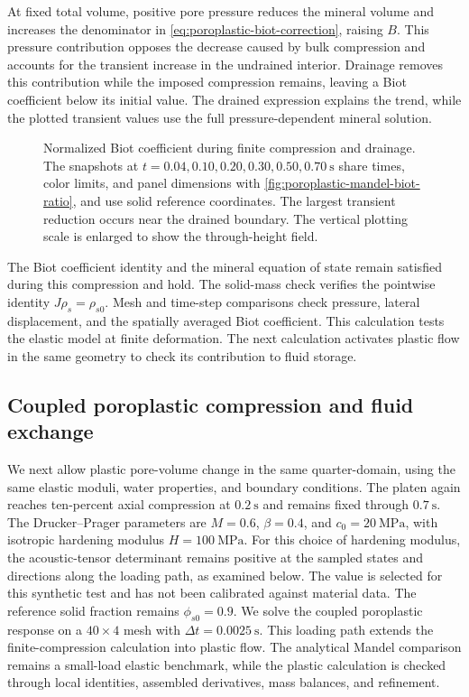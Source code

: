 At fixed total volume, positive pore pressure reduces the mineral volume and
increases the denominator in \eqref{eq:poroplastic-biot-correction}, raising
\(B\). This pressure contribution opposes the decrease caused by bulk
compression and accounts for the transient increase in the undrained interior.
Drainage removes this contribution while the imposed compression remains,
leaving a Biot coefficient below its initial value. The drained expression explains
the trend, while the plotted transient values use the full pressure-dependent
mineral solution.

\begin{figure}[ht]
 \centering
 \caption{Normalized Biot coefficient during finite compression and drainage.
 The snapshots at \(t=0.04,0.10,0.20,0.30,0.50,0.70\ \mathrm{s}\)
 share times, color limits, and panel dimensions with
 \cref{fig:poroplastic-mandel-biot-ratio}, and use solid reference coordinates.
 The largest transient reduction occurs near the drained boundary.  The vertical
 plotting scale is enlarged to show the through-height field.}
 \label{fig:mandel-normalized-biot-contours}
\end{figure}

The Biot coefficient identity and the mineral equation of state remain
satisfied during this compression and hold.  The solid-mass check verifies
the pointwise identity \(J\rho_s=\rho_{s0}\).  Mesh and time-step
comparisons check pressure, lateral
displacement, and the spatially averaged Biot coefficient.  This calculation
tests the elastic model at finite deformation.  The next calculation activates
plastic flow in the same geometry to check its contribution to fluid storage.
\FloatBarrier

\subsection{Coupled poroplastic compression and fluid exchange}
\label{sec:coupled-poroplastic-mandel}

We next allow plastic pore-volume change in the same quarter-domain, using
the same elastic moduli, water properties, and boundary conditions.  The
platen again reaches ten-percent axial compression at \(0.2\ \mathrm{s}\)
and remains fixed through \(0.7\ \mathrm{s}\).  The Drucker--Prager parameters
are \(M=0.6\), \(\beta=0.4\), and \(c_0=20\ \mathrm{MPa}\), with
isotropic hardening modulus \(H=100\ \mathrm{MPa}\).
For this choice of hardening modulus, the acoustic-tensor determinant
remains positive at the sampled states and directions along the loading
path, as examined below.  The value is selected for this synthetic test
and has not been calibrated against material data.
The reference solid fraction remains \(\phi_{s0}=0.9\).
We solve the coupled poroplastic response on a \(40\times4\) mesh with
\(\Delta t=0.0025\ \mathrm{s}\).  This loading path extends the
finite-compression calculation into plastic flow.  The analytical Mandel
comparison remains a small-load elastic benchmark, while the plastic
calculation is checked through local identities, assembled derivatives,
mass balances, and refinement.

